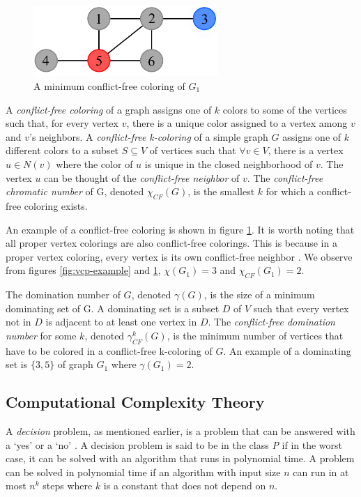 \documentclass{sig-alternate}
\begin{document}
\begin{figure}[h]
	\centering
	\includegraphics[width=7cm]{../figures/example-cfcp.pdf}
	\caption{A minimum conflict-free coloring of $G_1$}\label{fig:cfcp-example}
\end{figure}

A \emph{conflict-free coloring} of a graph assigns one of $k$ colors to some of the vertices such that, for every vertex $v$, there is a unique color assigned to a vertex among $v$ and $v$'s neighbors. A \emph{conflict-free k-coloring} of a simple graph $G$ assigns one of $k$ different colors to a subset $S \subseteq V$ of vertices such that $\forall v \in V$, there is a vertex $u \in N(v)$ where the color of $u$ is unique in the closed neighborhood of $v$. The vertex $u$ can be thought of the \emph{conflict-free neighbor} of $v$. The \emph{conflict-free chromatic number} of G, denoted $\chi_{CF}(G)$, is the smallest $k$ for which a conflict-free coloring exists. \cite{abel2017three}

An example of a conflict-free coloring is shown in figure \ref{fig:cfcp-example}. It is worth noting that all proper vertex colorings are also conflict-free colorings. This is because in a proper vertex coloring, every vertex is its own conflict-free neighbor \cite{abel2017three}. We observe from figures \ref{fig:vcp-example} and \ref{fig:cfcp-example}, $\chi(G_1) = 3$ and $\chi_{CF}(G_1) = 2$.

The domination number of $G$, denoted $\gamma(G)$, is the size of a minimum dominating set of G. A dominating set is a subset $D$ of $V$ such that every vertex not in $D$ is adjacent to at least one vertex in $D$. The \emph{conflict-free domination number} for some $k$, denoted $\gamma_{CF}^k(G)$, is the minimum number of vertices that have to be colored in a conflict-free k-coloring of $G$. An example of a dominating set is $\{3, 5\}$ of graph $G_1$ where $\gamma(G_1) = 2$.

\subsection{Computational Complexity Theory}
\label{sec:complexitytheory}
A \emph{decision} problem, as mentioned earlier, is a problem that can be answered with a `yes' or a `no' \cite{sipser2006introduction}. A decision problem is said to be in the class \emph{P} if in the worst case, it can be solved with an algorithm that runs in polynomial time. A problem can be solved in polynomial time if an algorithm with input size $n$ can run in at most $n^k$ steps where $k$ is a constant that does not depend on $n$.
\end{document}
